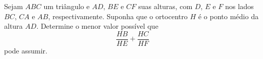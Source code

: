 Sejam $ABC$ um triângulo e $AD$, $BE$ e $CF$ suas alturas, com $D$, $E$ e $F$ nos lados $BC$, $CA$ e $AB$, respectivamente.
Suponha que o ortocentro $H$ é o ponto médio da altura $AD$.
Determine o menor valor possível que \[\frac{HB}{HE} + \frac{HC}{HF}\] pode assumir.
